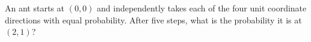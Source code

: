 An ant starts at $(0,0)$ and independently takes each of the four unit coordinate directions with equal probability. After five steps, what is the probability it is at $(2,1)$?
